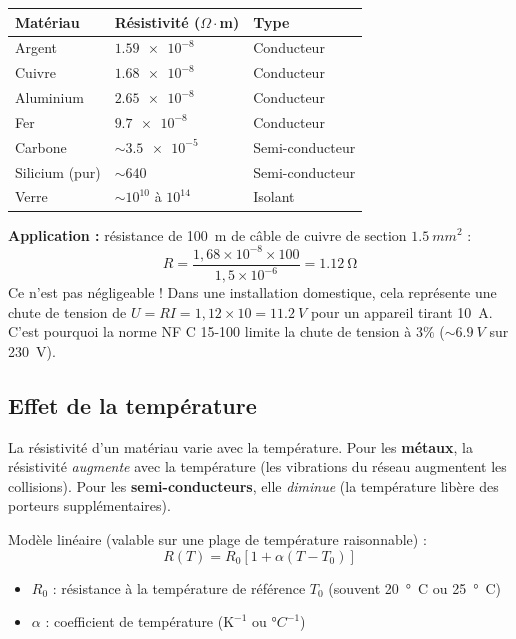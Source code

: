 \documentclass[12pt,a4paper,twoside]{book}
\begin{document}
\begin{center}
\begin{tabular}{lll}
\toprule
\textbf{Matériau} & \textbf{Résistivité} ($\Omega\cdot$m) & \textbf{Type} \\
\midrule
Argent & $\SI{1.59e-8}{}$ & Conducteur \\
Cuivre & $\SI{1.68e-8}{}$ & Conducteur \\
Aluminium & $\SI{2.65e-8}{}$ & Conducteur \\
Fer & $\SI{9.7e-8}{}$ & Conducteur \\
Carbone & $\sim \SI{3.5e-5}{}$ & Semi-conducteur \\
Silicium (pur) & $\sim \SI{640}{}$ & Semi-conducteur \\
Verre & $\sim 10^{10}$ à $10^{14}$ & Isolant \\
\bottomrule
\end{tabular}
\end{center}

\begin{pratique}
\textbf{Application :} résistance de \SI{100}{m} de câble de cuivre de section $\SI{1.5}{mm^2}$ :
\[
R = \frac{1{,}68\times10^{-8} \times 100}{1{,}5\times10^{-6}} = \SI{1.12}{\ohm}
\]
Ce n'est pas négligeable ! Dans une installation domestique, cela représente une chute de tension de $U = RI = 1{,}12 \times 10 = \SI{11.2}{V}$ pour un appareil tirant \SI{10}{A}. C'est pourquoi la norme NF C 15-100 limite la chute de tension à $3\%$ ($\sim \SI{6.9}{V}$ sur \SI{230}{V}).
\end{pratique}

\subsection{Effet de la température}

La résistivité d'un matériau varie avec la température. Pour les \textbf{métaux}, la résistivité \textit{augmente} avec la température (les vibrations du réseau augmentent les collisions). Pour les \textbf{semi-conducteurs}, elle \textit{diminue} (la température libère des porteurs supplémentaires).

\begin{formule}
Modèle linéaire (valable sur une plage de température raisonnable) :
\[
\boxed{R(T) = R_0 \left[1 + \alpha (T - T_0)\right]}
\]
\begin{itemize}[nosep]
\item $R_0$ : résistance à la température de référence $T_0$ (souvent \SI{20}{°C} ou \SI{25}{°C})
\item $\alpha$ : coefficient de température ($\text{K}^{-1}$ ou $°C^{-1}$)
\end{itemize}
\end{formule}
\end{document}
